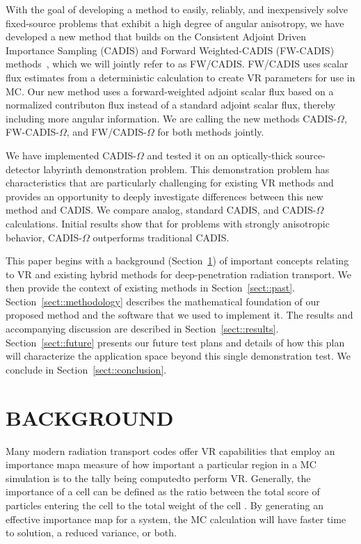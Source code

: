 \documentclass[12pt]{article}
\begin{document}
With the goal of developing a method to easily, reliably, and inexpensively solve fixed-source problems that exhibit a high degree of angular anisotropy, we have developed a new method that builds on the Consistent Adjoint Driven Importance Sampling (CADIS) and Forward Weighted-CADIS (FW-CADIS) methods~\cite{wagner_forward-weighted_2007}, which we will jointly refer to as FW/CADIS. 
FW/CADIS uses scalar flux estimates from a deterministic calculation to create VR parameters for use in MC.
Our new method uses a forward-weighted adjoint scalar flux based on a normalized contributon flux instead of a standard adjoint scalar flux, thereby including more angular information. 
We are calling the new methods CADIS-$\Omega$, FW-CADIS-$\Omega$, and FW/CADIS-$\Omega$ for both methods jointly.

We have implemented CADIS-$\Omega$ and tested it on an optically-thick source-detector labyrinth demonstration problem.
This demonstration problem has characteristics that are particularly challenging for existing VR methods and provides an opportunity to deeply investigate differences between this new method and CADIS.
We compare analog, standard CADIS, and CADIS-$\Omega$ calculations. 
Initial results show that for problems with strongly anisotropic behavior, CADIS-$\Omega$ outperforms traditional CADIS.

This paper begins with a background (Section~\ref{sect::second}) of important concepts relating to VR and existing hybrid methods for deep-penetration radiation transport. 
We then provide the context of existing methods in Section~\ref{sect::past}. 
Section~\ref{sect::methodology} describes the mathematical foundation of our proposed method and the software that we used to implement it. 
The results and accompanying discussion are described in Section~\ref{sect::results}. Section~\ref{sect::future} presents our future test plans and details of how this plan will characterize the application space beyond this single demonstration test. 
We conclude in Section~\ref{sect::conclusion}. 

\section{BACKGROUND}
\label{sect::second}

Many modern radiation transport codes offer VR capabilities that employ an importance map\textemdash a measure of how important a particular region in a MC simulation is to the tally being computed\textemdash to perform VR. Generally, the importance of a cell can be defined as the ratio between the total score of particles entering the cell to the total weight of the cell \cite{booth_automatic_1982}. By generating an effective importance map for a system, the MC calculation will have faster time to solution, a reduced variance, or both. 
\end{document}
